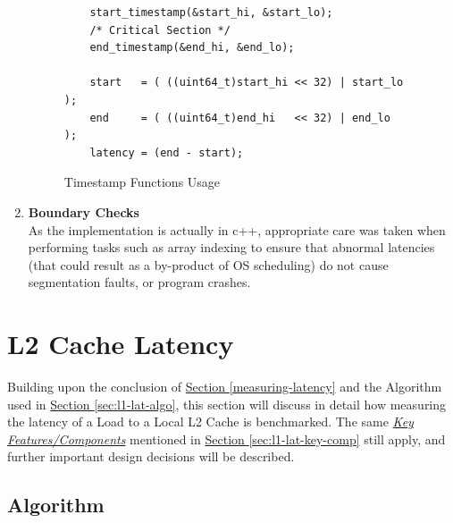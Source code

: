 \documentclass[bsc,frontabs,twoside,singlespacing,parskip,deptreport]{infthesis}     %
\begin{document}
\begin{enumerate}
{\begin{figure}[h!]
\begin{verbatim}
    start_timestamp(&start_hi, &start_lo);
    /* Critical Section */
    end_timestamp(&end_hi, &end_lo);  
    
    start   = ( ((uint64_t)start_hi << 32) | start_lo );
    end     = ( ((uint64_t)end_hi   << 32) | end_lo   );
    latency = (end - start);
        \end{verbatim}
        \caption{Timestamp Functions Usage}
        \label{fig:timestamp_usage_l1}
    \end{figure}
    
    }
    \item{{\bf Boundary Checks} \\
    As the implementation is actually in c++, appropriate care was taken when performing tasks such as array indexing to ensure that abnormal latencies (that could result as a by-product of OS scheduling) do not cause segmentation faults, or program crashes. }
\end{enumerate}



\newpage

\section{L2 Cache Latency}\label{sec:l2-cache-latency}
Building upon the conclusion of \hyperref[measuring-latency]{Section \ref{measuring-latency}} and the Algorithm used in \hyperref[measuring-latency]{Section \ref{sec:l1-lat-algo}}, this section will discuss in detail how measuring the latency of a Load to a Local L2 Cache is benchmarked. The same \hyperref[sec:l1-lat-key-comp]{\emph{Key Features/Components}} mentioned in \hyperref[measuring-latency]{Section \ref{sec:l1-lat-key-comp}} still apply, and further important design decisions will be described.

\subsection{Algorithm}\label{sec:l2-lat-algo}
\end{document}
